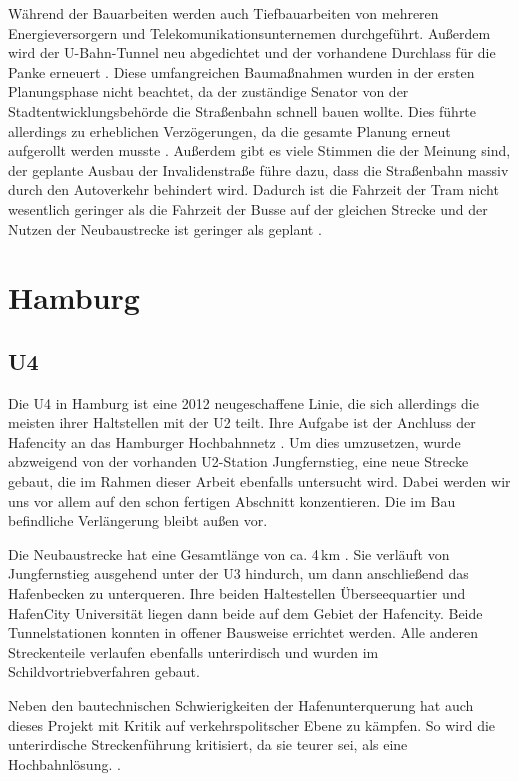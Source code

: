 Während der Bauarbeiten werden auch Tiefbauarbeiten von mehreren
Energieversorgern und Telekomunikationsunternemen
durchgeführt. Außerdem wird der U-Bahn-Tunnel neu abgedichtet und
der vorhandene Durchlass für die Panke
erneuert \cite{flyerInvalidestr}. Diese umfangreichen Baumaßnahmen
wurden in der ersten Planungsphase nicht beachtet, da der zuständige
Senator von der Stadtentwicklungsbehörde die Straßenbahn schnell bauen
wollte. Dies führte allerdings zu erheblichen Verzögerungen, da die
gesamte Planung erneut aufgerollt werden
musste \cite{bzSchnell}. Außerdem gibt es viele Stimmen die der Meinung
sind, der geplante Ausbau der Invalidenstraße führe dazu, dass die
Straßenbahn massiv durch den Autoverkehr behindert wird. Dadurch ist
die Fahrzeit der Tram nicht wesentlich geringer als die Fahrzeit der
Busse auf der gleichen Strecke und der Nutzen der Neubaustrecke ist
geringer als geplant \cite{protram}.

\section{Hamburg}
\subsection*{U4}

Die U4 in Hamburg ist eine 2012 neugeschaffene Linie, die sich allerdings die
meisten ihrer Haltstellen mit der U2 teilt. Ihre Aufgabe ist der Anchluss der
Hafencity an das Hamburger Hochbahnnetz \cite{keuHH}. Um dies umzusetzen, wurde
abzweigend von der vorhanden U2-Station Jungfernstieg, eine neue Strecke gebaut,
die im Rahmen dieser Arbeit ebenfalls untersucht wird. Dabei werden wir uns vor
allem auf den schon fertigen Abschnitt konzentieren. Die im Bau befindliche
Verlängerung bleibt außen vor.

Die Neubaustrecke hat eine Gesamtlänge von ca. 4\,km \cite{keuHH}. Sie verläuft
von Jungfernstieg ausgehend unter der U3 hindurch, um dann anschließend das
Hafenbecken zu unterqueren. Ihre beiden Haltestellen Überseequartier und
HafenCity Universität liegen dann beide auf dem Gebiet der Hafencity. Beide
Tunnelstationen konnten in offener Bausweise errichtet werden. Alle anderen
Streckenteile verlaufen ebenfalls unterirdisch und wurden im
Schildvortriebverfahren gebaut.

Neben den bautechnischen Schwierigkeiten der Hafenunterquerung hat auch dieses
Projekt mit Kritik auf verkehrspolitscher Ebene zu kämpfen. So wird die
unterirdische Streckenführung kritisiert, da sie teurer sei, als eine
Hochbahnlösung. \cite{hamburgerAbendblattu4}.

